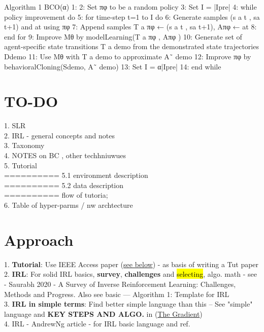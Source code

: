 \documentclass{article}
\newcommand{\hlc}[2][purple!10]{{\colorlet{foo}{#1} \sethlcolor{foo}\hl{#2}}}
\begin{document}
Algorithm 1 BCO(α)
1: 
2: Set πφ to be a random policy
3: Set I = |Ipre|
4: while policy improvement do
5: for time-step t=1 to I do
6: Generate samples (s
a
t
, sa
t+1) and at using πφ
7: Append samples T
a
πφ ← (s
a
t
, sa
t+1), Aπφ ← at
8: end for
9: Improve Mθ by modelLearning(T
a
πφ
, Aπφ
)
10: Generate set of agent-specific state transitions T
a
demo
from the demonstrated state trajectories Ddemo
11: Use Mθ with T
a
demo to approximate A˜
demo
12: Improve πφ by behavioralCloning(Sdemo, A˜
demo)
13: Set I = α|Ipre|
14: end while

\section{TO-DO}

1. SLR \\
2. IRL - general concepts and notes \\
3. Taxonomy \\
4. NOTES on BC , other techhniuwues\\
5. Tutorial \\
 ========== 5.1 environment description\\
 ========== 5.2 data  description\\
 ========== flow of tutoria; \\
 
6. Table of hyper-parms / nw archtecture\\



\clearpage

\section{Approach}

1. \textbf{Tutorial}: Use IEEE Access paper (\href{https://ieeexplore.ieee.org/document/9086464}{see below}) - as basis of writing a Tut paper\\
2. \textbf{IRL}: For solid IRL basics, \textbf{survey}, \textbf{challenges} and \hlc{selecting},  algo. math - see - Saurabh 2020 - A Survey of Inverse Reinforcement Learning: Challenges, Methods and Progress. Also see basic --- Algorithm 1: Template for IRL \\
3. \textbf{IRL in simple terms}: Find better simple language than this --  See "simple" language and \textbf{KEY STEPS AND ALGO.} in (\href{https://thegradient.pub/learning-from-humans-what-is-inverse-reinforcement-learning/}{The Gradient}) \\
4. IRL - AndrewNg article - for IRL basic language and ref. 
\end{document}

